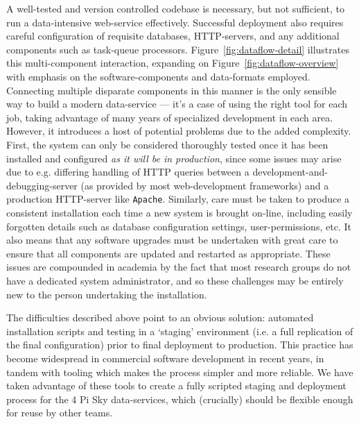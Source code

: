 \documentclass[5p,authoryear]{elsarticle}
\begin{document}
A well-tested and version controlled codebase is necessary, but not sufficient, to run a data-intensive web-service effectively. 
Successful deployment also requires careful configuration of requisite databases, HTTP-servers, and any additional components such as task-queue processors. 
Figure~\ref{fig:dataflow-detail} illustrates this multi-component interaction, expanding on Figure~\ref{fig:dataflow-overview} with emphasis on the software-components and data-formats employed.
Connecting multiple disparate components in this manner is the only sensible way to build a modern data-service --- it's a case of using the right tool for each job, taking advantage of many years of specialized development in each area. 
However, it introduces a host of potential problems due to the added complexity. 
First, the system can only be considered thoroughly tested once it has been installed and configured \textit{as it will be in production}, since some issues may arise due to e.g. differing handling of HTTP queries between a development-and-debugging-server (as provided by most web-development frameworks) and a production HTTP-server like \texttt{Apache}. 
Similarly, care must be taken to produce a consistent installation each time a new system is brought on-line, including easily forgotten details such as database configuration settings, user-permissions, etc.
It also means that any software upgrades must be undertaken with great care to ensure that all components are updated and restarted as appropriate.
These issues are compounded in academia by the fact that most research groups do not have a dedicated system administrator, and so these challenges may be entirely new to the person undertaking the installation.

The difficulties described above point to an obvious solution: automated installation scripts and testing in a `staging' environment (i.e. a full replication of the final configuration) prior to final deployment to production. 
This practice has become widespread in commercial software development in recent years, in tandem with tooling which makes the process simpler and more reliable. 
We have taken advantage of these tools to create a fully scripted staging and deployment process for the 4 Pi Sky data-services, which (crucially) should be flexible enough for reuse by other teams. 
\end{document}
